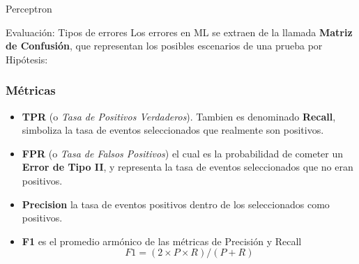 \documentclass[11pt]{beamer}
\begin{document}
\begin{frame}{Perceptron}
    
\end{frame}
\begin{frame}{Evaluaci\'on: Tipos de errores}
Los errores en ML se extraen de la llamada \textbf{Matriz de Confusi\'on}, 
que representan los posibles escenarios de una prueba por Hip\'otesis:


\end{frame}
\begin{frame} \frametitle{M\'etricas}
 \small
\begin{itemize}[<+->]
 \item \textbf{TPR} (o \textit{Tasa de Positivos Verdaderos}). Tambien es denominado \textbf{Recall}, simboliza la tasa de eventos seleccionados que realmente son positivos.
\item \textbf{FPR} (o \textit{Tasa de Falsos Positivos}) el cual es la probabilidad de cometer un \textbf{Error de Tipo II}, y representa la tasa de eventos seleccionados que no eran positivos.
\item \textbf{Precision} la tasa de eventos positivos dentro de los seleccionados como positivos.
\item \textbf{F1} es el promedio arm\'onico de las m\'etricas de Precisi\'on y Recall
$$F1 = (2 \times P \times R)/(P + R) $$
\end{itemize}
\end{frame}
\end{document}
